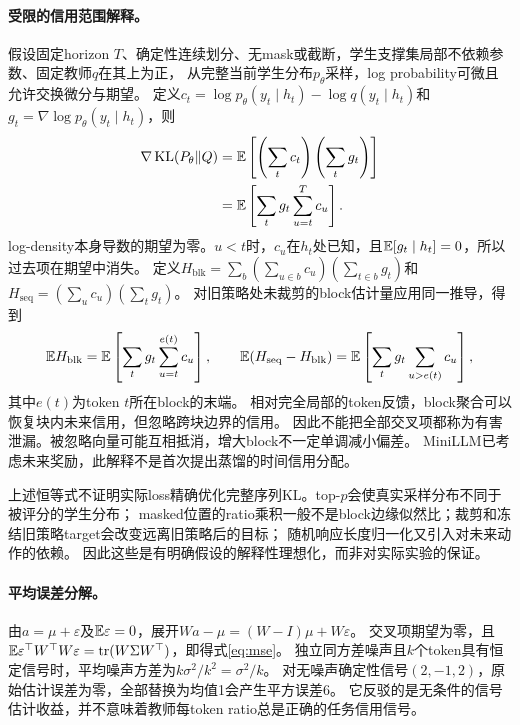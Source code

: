 \paragraph{受限的信用范围解释。}
假设固定horizon $T$、确定性连续划分、无mask或截断，学生支撑集局部不依赖参数、固定教师$q$在其上为正，
从完整当前学生分布$p_\theta$采样，log probability可微且允许交换微分与期望。
定义$c_t=\log p_\theta(y_t\mid h_t)-\log q(y_t\mid h_t)$和
$g_t=\nabla\log p_\theta(y_t\mid h_t)$，则
\begin{align}
 \nabla\operatorname{KL}(P_\theta\Vert Q)
 &=\mathbb{E}\left[\left(\sum_t c_t\right)\left(\sum_t g_t\right)\right] \\
 &=\mathbb{E}\left[\sum_t g_t\sum_{u=t}^{T}c_u\right].
 \label{eq:fullcredit}
\end{align}
log-density本身导数的期望为零。$u<t$时，$c_u$在$h_t$处已知，且$\mathbb{E}[g_t\mid h_t]=0$，所以过去项在期望中消失。
定义$H_{\mathrm{blk}}=\sum_b(\sum_{u\in b}c_u)(\sum_{t\in b}g_t)$和$H_{\mathrm{seq}}=(\sum_u c_u)(\sum_t g_t)$。
对旧策略处未裁剪的block估计量应用同一推导，得到
\begin{equation}
 \mathbb{E} H_{\mathrm{blk}}=\mathbb{E}\left[\sum_t g_t\sum_{u=t}^{e(t)}c_u\right],\qquad
 \mathbb{E}(H_{\mathrm{seq}}-H_{\mathrm{blk}})=\mathbb{E}\left[\sum_t g_t\sum_{u>e(t)}c_u\right],
 \label{eq:horizon}
\end{equation}
其中$e(t)$为token $t$所在block的末端。
相对完全局部的token反馈，block聚合可以恢复块内未来信用，但忽略跨块边界的信用。
因此不能把全部交叉项都称为有害泄漏。被忽略向量可能互相抵消，增大block不一定单调减小偏差。
MiniLLM已考虑未来奖励，此解释不是首次提出蒸馏的时间信用分配\citep{minillm}。

上述恒等式不证明实际loss精确优化完整序列KL。top-$p$会使真实采样分布不同于被评分的学生分布；
masked位置的ratio乘积一般不是block边缘似然比；裁剪和冻结旧策略target会改变远离旧策略后的目标；
随机响应长度归一化又引入对未来动作的依赖。
因此这些是有明确假设的解释性理想化，而非对实际实验的保证。

\paragraph{平均误差分解。}
由$a=\mu+\varepsilon$及$\mathbb{E}\varepsilon=0$，展开$Wa-\mu=(W-I)\mu+W\varepsilon$。
交叉项期望为零，且$\mathbb{E}\varepsilon^\top W^\top W\varepsilon=\operatorname{tr}(W\Sigma W^\top)$，即得式\ref{eq:mse}。
独立同方差噪声且$k$个token具有恒定信号时，平均噪声方差为$k\sigma^2/k^2=\sigma^2/k$。
对无噪声确定性信号$(2,-1,2)$，原始估计误差为零，全部替换为均值1会产生平方误差6。
它反驳的是无条件的信号估计收益，并不意味着教师每token ratio总是正确的任务信用信号。

